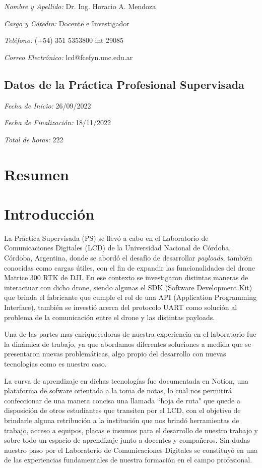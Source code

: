 \documentclass[12pt]{article}
\begin{document}
\textsl{Nombre y Apellido:} Dr. Ing. Horacio A. Mendoza

\textsl{Cargo y Cátedra:} Docente e Investigador

\textsl{Teléfono:} (+54) 351 5353800 int 29085

\textsl{Correo Electrónico:} lcd@fcefyn.unc.edu.ar

\subsection{Datos de la Práctica Profesional Supervisada}

\textsl{Fecha de Inicio:} 26/09/2022

\textsl{Fecha de Finalización:} 18/11/2022

\textsl{Total de horas:} 222

\tableofcontents
\newpage

\justifying
\section{Resumen}
\setlength\parindent{24pt} 
\newpage
\section{Introducción}
La Práctica Supervisada (PS) se llevó a cabo en el Laboratorio de Comunicaciones Digitales (LCD) de la Universidad Nacional de Córdoba, Córdoba, Argentina, donde se abordó el desafío de desarrollar \textit{payloads}, también conocidas como cargas útiles, con el fin de expandir las funcionalidades del drone Matrice 300 RTK de DJI.
En ese contexto se investigaron distintas maneras de interactuar con dicho drone, siendo algunas el SDK (Software Development Kit) que brinda el fabricante que cumple el rol de una API (Application Programming Interface), también se investió acerca del
protocolo UART como solución al problema de la comunicación entre el drone y las distintas payloads.

Una de las partes mas enriquecedoras de nuestra experiencia en el laboratorio fue la dinámica de trabajo, ya que 
abordamos diferentes soluciones a medida que se presentaron nuevas problemáticas, algo propio del desarrollo con
nuevas tecnologías como es nuestro caso. 

La curva de aprendizaje en dichas tecnologías fue documentada en Notion, una plataforma de sofware orientada a 
la toma de notas, lo cual nos permitirá confeccionar de una manera concisa una llamada ``hoja de ruta"  que quede
a disposición de otros estudiantes que transiten por el LCD, con el objetivo de brindarle alguna retribución a la institución
que nos brindó herramientas de trabajo, acceso a equipos, placas e insumos para el desarrollo de nuestro trabajo
y sobre todo un espacio de aprendizaje junto a docentes y compañeros. Sin dudas nuestro paso por el Laboratorio de
Comunicaciones Digitales se constituyó en una de las experiencias fundamentales de nuestra formación en el campo profesional.
\end{document}
